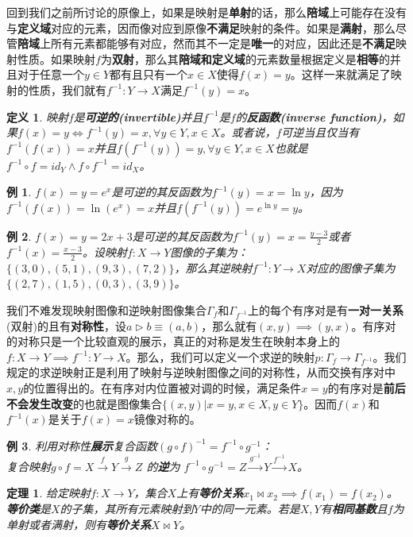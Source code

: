 \documentclass[mathserif,hyperref,UTF8,openany,b5paper]{ctexbook}
\newtheorem{exmp}{例}[section]
\newtheorem{defn}{定义}[section]
\newtheorem{thm}{定理}[section]
\begin{document}
回到我们之前所讨论的原像上，如果是映射是\textbf{单射}的话，那么\textbf{陪域}上可能存在没有与\textbf{定义域}对应的元素，因而像对应到原像\textbf{不满足}映射的条件。如果是\textbf{满射}，那么尽管\textbf{陪域}上所有元素都能够有对应，然而其不一定是\textbf{唯一}的对应，因此还是\textbf{不满足}映射性质。如果映射$f$为\textbf{双射}，那么其\textbf{陪域和定义域}的元素数量根据定义是\textbf{相等}的并且对于任意一个$y\in Y$都有且只有一个$x\in X$使得$f(x)=y$。这样一来就满足了映射的性质，我们就有$f^{-1}:Y \xrightarrow{} X$满足$f^{-1}(y)=x$。
\begin{defn}
映射$f$是\textbf{可逆的(invertible)}并且$f^{-1}$是$f$的\textbf{反函数(inverse function)}，如果$f(x)=y \iff f^{-1}(y)=x,\forall y\in Y,x \in X$。或者说，$f$可逆当且仅当有$f^{-1}(f(x))=x $并且$ f(f^{-1}(y)) = y, \forall y\in Y,x \in X$也就是$f^{-1}\circ f = id_Y \land f\circ f^{-1} = id_X$。
\end{defn}
\begin{exmp}
$f(x)=y=e^x$是可逆的其反函数为$f^{-1}(y) = x =\ln y $，因为$f^{-1}(f(x))=\ln (e^x)=x $并且$ f(f^{-1}(y)) = e^{\ln y}= y$。
\end{exmp}
\begin{exmp}
$f(x)=y=2x+3$是可逆的其反函数为$f^{-1}(y)=x = \frac{y-3}{2}$或者$f^{-1}(x)= \frac{x-3}{2}$。设映射$f:X \xrightarrow{}Y$图像的子集为：$\{(3, 0), (5, 1), (9, 3), (7, 2)\}$，那么其逆映射$f^{-1}:Y \xrightarrow{}X$对应的图像子集为$\{(2, 7), (1, 5), (0, 3), (3, 9)\}$。
\end{exmp}

我们不难发现映射图像和逆映射图像集合$\Gamma_f$和$\Gamma_{f^{-1}}$上的每个有序对是有\textbf{一对一关系}(双射)的且有\textbf{对称性}，设$a\vartriangleright b \equiv (a,b)$，那么就有$(x,y)\implies(y,x)$。有序对的对称只是一个比较直观的展示，真正的对称是发生在映射本身上的$f:X \xrightarrow{}Y\implies f^{-1}:Y \xrightarrow{}X$。那么，我们可以定义一个求逆的映射$p:\Gamma_f \xrightarrow{}\Gamma_{f^{-1}}$。我们规定的求逆映射正是利用了映射与逆映射图像之间的对称性，从而交换有序对中$x,y$的位置得出的。在有序对内位置被对调的时候，满足条件$x=y$的有序对是\textbf{前后不会发生改变}的也就是图像集合$\{(x,y)|x=y,x\in X ,y\in Y\}$。因而$f(x)$和$f^{-1}(x)$是关于$f(x)=x$镜像对称的。
\begin{exmp}
利用对称性\textbf{展示}复合函数$(g\circ f)^{-1} = f^{-1} \circ g^{-1}$：\\
复合映射$g\circ f = X\xrightarrow{f}Y\xrightarrow{g}Z$ 的\textbf{逆}为 $f^{-1} \circ g^{-1}= Z\xrightarrow{g^{-1}}Y\xrightarrow{f^{-1}}X$。
\end{exmp}
\begin{thm}
给定映射$f:X \xrightarrow{} Y$，集合$X$上有\textbf{等价关系}$x_1 \bowtie x_2 \implies f(x_1)=f(x_2)$。\textbf{等价类}是$X$的子集，其所有元素映射到$Y$中的同一元素。若是$X,Y$有\textbf{相同基数}且$f$为单射或者满射，则有\textbf{等价关系}$X \bowtie Y$。
\end{thm}
\end{document}
